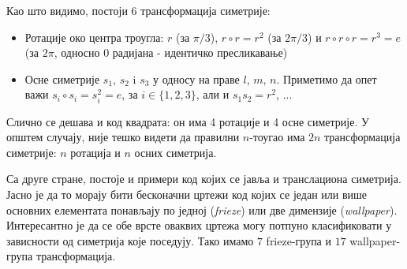 \documentclass{report}
\theoremstyle{plain}
\theoremstyle{definition}
\begin{document}
Као што видимо, постоји 6 трансформација симетрије: \begin{itemize}
                                                         \item Ротације око центра троугла: $r$ (за $\pi/3$), $r\circ r = r^2$ (за $2\pi/3$) и $r\circ r \circ r = r^3 = e$ (за $2\pi$, односно $0$ радијана - идентичко пресликавање)
                                                         \item Осне симетрије $s_1$, $s_2$ i $s_3$ у односу на праве $l$, $m$, $n$. Приметимо да опет важи $s_i \circ s_i = s_i^2 = e$, за $i\in \lbrace 1, 2, 3 \rbrace$, али и $s_1 s_2 = r^2$, ...
                                                       \end{itemize}
Слично се дешава и код квадрата: он има 4 ротације и 4 осне симетрије. У општем случају, није тешко видети да правилни $n$-тоугао има $2n$ трансформација симетрије: $n$ ротација и $n$ осних симетрија.

Са друге стране, постоје и примери код којих се јавља и транслациона симетрија. Јасно је да то морају бити бесконачни цртежи код којих се један или више основних елементата понављају по једној (\emph{frieze}) или две димензије (\emph{wallpaper}). Интересантно је да се обе врсте оваквих цртежа могу потпуно класификовати у зависности од симетрија које поседују. Тако имамо $7$ frieze-група и $17$ wallpaper-група трансформација.
\end{document}
